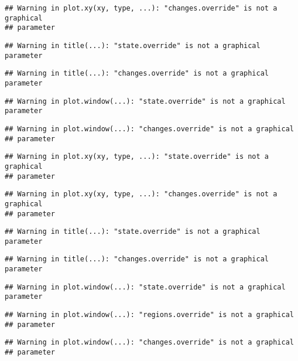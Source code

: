 \documentclass[]{book}
\theoremstyle{definition}
\theoremstyle{definition}
\theoremstyle{definition}
\theoremstyle{remark}
\begin{document}
\begin{verbatim}
## Warning in plot.xy(xy, type, ...): "changes.override" is not a graphical
## parameter
\end{verbatim}

\begin{verbatim}
## Warning in title(...): "state.override" is not a graphical parameter
\end{verbatim}

\begin{verbatim}
## Warning in title(...): "changes.override" is not a graphical parameter
\end{verbatim}

\begin{verbatim}
## Warning in plot.window(...): "state.override" is not a graphical parameter
\end{verbatim}

\begin{verbatim}
## Warning in plot.window(...): "changes.override" is not a graphical
## parameter
\end{verbatim}

\begin{verbatim}
## Warning in plot.xy(xy, type, ...): "state.override" is not a graphical
## parameter
\end{verbatim}

\begin{verbatim}
## Warning in plot.xy(xy, type, ...): "changes.override" is not a graphical
## parameter
\end{verbatim}

\begin{verbatim}
## Warning in title(...): "state.override" is not a graphical parameter
\end{verbatim}

\begin{verbatim}
## Warning in title(...): "changes.override" is not a graphical parameter
\end{verbatim}

\begin{verbatim}
## Warning in plot.window(...): "state.override" is not a graphical parameter
\end{verbatim}

\begin{verbatim}
## Warning in plot.window(...): "regions.override" is not a graphical
## parameter
\end{verbatim}

\begin{verbatim}
## Warning in plot.window(...): "changes.override" is not a graphical
## parameter
\end{verbatim}
\end{document}
